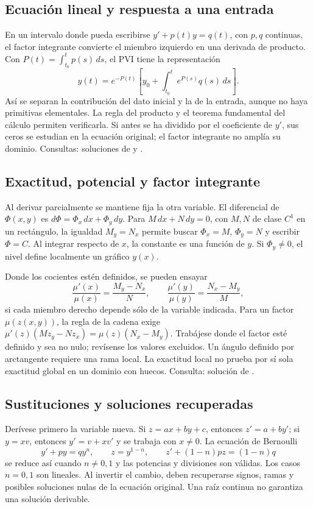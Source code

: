 %
\subsection*{Ecuación lineal y respuesta a una entrada}
\label{CH02-B01}
En un intervalo donde pueda escribirse $y'+p(t)y=q(t)$, con $p,q$
continuas, el factor integrante convierte el miembro izquierdo en una
derivada de producto. Con
$P(t)=\int_{t_0}^{t}p(s)\,ds$, el PVI tiene la representación
\[
 y(t)=e^{-P(t)}\left[y_0+\int_{t_0}^{t}e^{P(s)}q(s)\,ds\right].
\]
Así se separan la contribución del dato inicial y la de la entrada, aunque
no haya primitivas elementales. La regla del producto y el teorema
fundamental del cálculo permiten verificarla. Si antes se ha dividido por
el coeficiente de $y'$, sus ceros se estudian en la ecuación original;
el factor integrante no amplía su dominio.
Consultas: soluciones de  y .

%
\subsection*{Exactitud, potencial y factor integrante}
\label{CH02-B02}
Al derivar parcialmente se mantiene fija la otra variable. El diferencial
de $\Phi(x,y)$ es $d\Phi=\Phi_x\,dx+\Phi_y\,dy$. Para
$M\,dx+N\,dy=0$, con $M,N$ de clase $C^1$ en un rectángulo, la igualdad
$M_y=N_x$ permite buscar $\Phi_x=M$, $\Phi_y=N$ y escribir
$\Phi=C$. Al integrar respecto de $x$, la constante es una función de $y$.
Si $\Phi_y\ne0$, el nivel define localmente un gráfico $y(x)$.

Donde los cocientes estén definidos, se pueden ensayar
\[
 \frac{\mu'(x)}{\mu(x)}=\frac{M_y-N_x}{N},\qquad
 \frac{\mu'(y)}{\mu(y)}=\frac{N_x-M_y}{M},
\]
si cada miembro derecho depende sólo de la variable indicada.
Para un factor $\mu(z(x,y))$, la regla de la cadena exige
$\mu'(z)(M z_y-N z_x)=\mu(z)(N_x-M_y)$.
Trabájese donde el factor esté definido y sea no nulo; revísense los
valores excluidos. Un ángulo definido por arctangente requiere una rama
local. La exactitud local no prueba por sí sola exactitud global en un
dominio con huecos. Consulta: solución de .

%
\subsection*{Sustituciones y soluciones recuperadas}
\label{CH02-B03}
Derívese primero la variable nueva. Si $z=ax+by+c$, entonces
$z'=a+by'$; si $y=xv$, entonces $y'=v+xv'$ y se trabaja con $x\ne0$.
La ecuación de Bernoulli
\[
 y'+py=qy^n,\qquad z=y^{1-n},\qquad
 z'+(1-n)pz=(1-n)q
\]
se reduce así cuando $n\ne0,1$ y las potencias y divisiones son válidas.
Los casos $n=0,1$ son lineales. Al invertir el cambio, deben recuperarse
signos, ramas y posibles soluciones nulas de la ecuación original.
Una raíz continua no garantiza una solución derivable.

